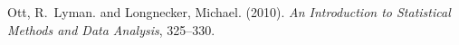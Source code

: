 \documentclass[twoside]{article}
\begin{document}
\begin{multicols}{2}

\begin{thebibliography}{99} %

Ott, R.~Lyman. and Longnecker, Michael. (2010).
\newblock \textit{An Introduction to Statistical Methods and Data Analysis}, 325--330.
 
\end{thebibliography}


\end{multicols}
\end{document}
